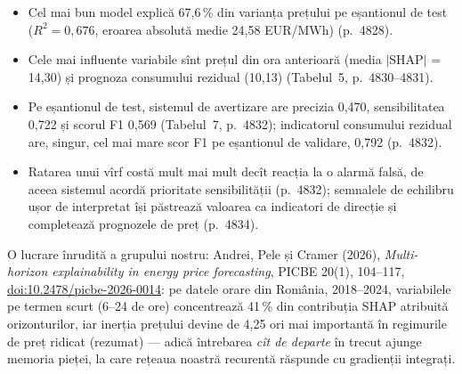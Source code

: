\textbf{}
\begin{itemize}
\item {}%
{Cel mai bun model explică 67,6\,\% din varianța prețului pe eșantionul de test ($R^2=0{,}676$, eroarea absolută medie 24,58 EUR/MWh) (p.~4828).}
\item {}%
{Cele mai influente variabile sînt prețul din ora anterioară (media $|$SHAP$|$ = 14,30) și prognoza consumului rezidual (10,13) (Tabelul~5, p.~4830--4831).}
\item {}%
{Pe eșantionul de test, sistemul de avertizare are precizia 0,470, sensibilitatea 0,722 și scorul F1 0,569 (Tabelul~7, p.~4832); indicatorul consumului rezidual are, singur, cel mai mare scor F1 pe eșantionul de validare, 0,792 (p.~4832).}
\item {}%
{Ratarea unui vîrf costă mult mai mult decît reacția la o alarmă falsă, de aceea sistemul acordă prioritate sensibilității (p.~4832); semnalele de echilibru ușor de interpretat își păstrează valoarea ca indicatori de direcție și completează prognozele de preț (p.~4834).}
\end{itemize}
{\footnotesize\color{FooterGray}%
{O lucrare înrudită a grupului nostru: Andrei, Pele și Cramer (2026), \emph{Multi-horizon explainability in energy price forecasting}, PICBE 20(1), 104--117, \href{https://doi.org/10.2478/picbe-2026-0014}{doi:10.2478/picbe-2026-0014}: pe datele orare din România, 2018--2024, variabilele pe termen scurt (6--24 de ore) concentrează 41\,\% din contribuția SHAP atribuită orizonturilor, iar inerția prețului devine de 4,25 ori mai importantă în regimurile de preț ridicat (rezumat) --- adică întrebarea \emph{cît de departe} în trecut ajunge memoria pieței, la care rețeaua noastră recurentă răspunde cu gradienții integrați.}}


